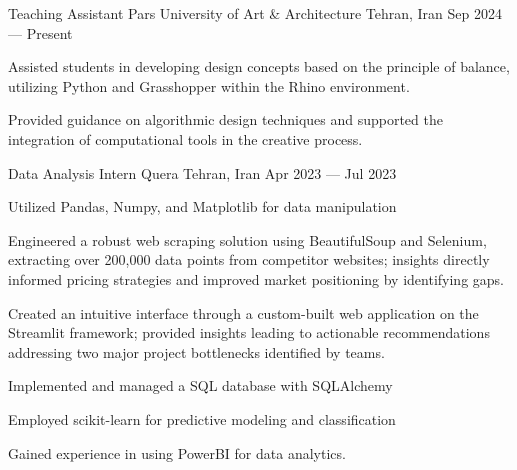 
\begin{cventries}
	
	\cventry
	{Teaching Assistant} %
	{Pars University of Art \& Architecture} %
	{Tehran, Iran} %
	{\textcolor{neutraltext}{Sep 2024 --- Present}} %
	{
		\begin{cvitems}
			\item Assisted students in developing design concepts based on the principle of balance, utilizing Python and Grasshopper within the Rhino environment. 
			\item Provided guidance on algorithmic design techniques and supported the integration of computational tools in the creative process.
		\end{cvitems}
	}
	\cventry
	{Data Analysis Intern} %
	{Quera} %
	{Tehran, Iran} %
	{\textcolor{neutraltext}{Apr 2023 --- Jul 2023}} %
	{
		\begin{cvitems}
			\item Utilized Pandas, Numpy, and Matplotlib for data manipulation 
			\item Engineered a robust web scraping solution using BeautifulSoup and Selenium, extracting over 200,000 data points from competitor websites; insights directly informed pricing strategies and improved market positioning by identifying gaps.
			\item Created an intuitive interface through a custom-built web application on the Streamlit framework; provided insights leading to actionable recommendations addressing two major project bottlenecks identified by teams.
			\item Implemented and managed a SQL database with SQLAlchemy
			\item Employed scikit-learn for predictive modeling and classification
			\item Gained experience in using PowerBI for data analytics.
		\end{cvitems}
	}
	

\end{cventries}
